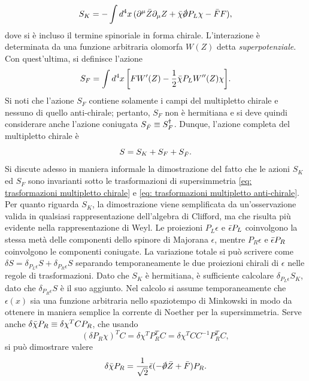 \begin{equation}
    S_K = -\int d^4x\,(\p^\mu\b{Z}\p_\mu Z + \b{\chi}\sl{\p}P_L\chi - \b{F}F),
\end{equation}
dove si è incluso il termine spinoriale in forma chirale. L'interazione è determinata da una funzione arbitraria olomorfa $W(Z)$ detta \emph{superpotenziale}. Con quest'ultima, si definisce l'azione 
\begin{equation}
    S_F = \int d^4x\,\bigg[FW'(Z) - \frac{1}{2}\bar{\chi}P_LW''(Z)\chi\bigg].
\end{equation}
Si noti che l'azione $S_F$ contiene solamente i campi del multipletto chirale e nessuno di quello anti-chirale; pertanto, $S_F$ non è hermitiana e si deve quindi considerare anche l'azione coniugata $S_{\bar{F}} \equiv S_F^\dag$. Dunque, l'azione completa del multipletto chirale è 
\begin{equation}
    S = S_K + S_F + S_{\bar{F}}.
\end{equation}
Si discute adesso in maniera informale la dimostrazione del fatto che le azioni $S_K$ ed $S_F$ sono invarianti sotto le trasformazioni di supersimmetria \eqref{eq: trasformazioni multipletto chirale} e \eqref{eq: trasformazioni multipletto anti-chirale}. Per quanto riguarda $S_K$, la dimostrazione viene semplificata da un'osservazione valida in qualsiasi rappresentazione dell'algebra di Clifford, ma che risulta più evidente nella rappresentazione di Weyl. Le proiezioni $P_L\epsilon$ e $\bar{\epsilon}P_L$ coinvolgono la stessa metà delle componenti dello spinore di Majorana $\epsilon$, mentre $P_R\epsilon$ e $\bar{\epsilon}P_R$ coinvolgono le componenti coniugate. La variazione totale si può scrivere come $\delta S = \delta_{P_L\epsilon}S + \delta_{P_R\epsilon}S$ separando temporaneamente le due proiezioni chirali di $\epsilon$ nelle regole di trasformazioni. Dato che $S_K$ è hermitiana, è sufficiente calcolare $\delta_{P_L\epsilon}S_K$, dato che $\delta_{P_R\epsilon}S$ è il suo aggiunto. Nel calcolo si assume temporaneamente che $\epsilon(x)$ sia una funzione arbitraria nello spaziotempo di Minkowski in modo da ottenere in maniera semplice la corrente di Noether per la supersimmetria. Serve anche $\delta\bar{\chi}P_R \equiv \delta \chi^TCP_R$, che usando
\begin{equation}
    (\delta P_R\chi)^TC = \delta \chi^TP_R^TC = \delta \chi^TCC^{-1}P_R^TC,
\end{equation}
si può dimostrare valere 
\begin{equation}
    \delta \b{\chi}P_R = \frac{1}{\sqrt{2}}\b{\epsilon}(-\sl{\p}\b{Z} + \b{F})P_R.
\end{equation}
